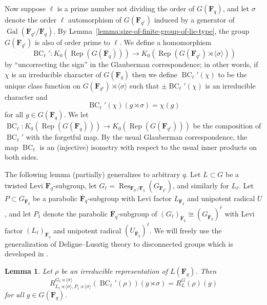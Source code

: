 \documentclass[11pt,reqno]{amsart}
\newtheorem{lemma}[theorem]{Lemma}
\theoremstyle{definition}
\newcommand{\F}{{\mathbf F}}
\DeclareMathOperator{\BC}{BC}
\DeclareMathOperator{\Gal}{Gal}
\DeclareMathOperator{\Rep}{Rep}
\DeclareMathOperator{\Res}{Res}
\newcommand{\ol}[1]{\overline{#1}}
\begin{document}
Now suppose $\ell$ is a prime number not dividing the order of $G(\F_q)$, and let $\sigma$ denote the order $\ell$ automorphism of $G(\F_{q^\ell})$ induced by a generator of $\Gal(\F_{q^\ell}/\F_q)$. By Lemma~\ref{lemma:size-of-finite-group-of-lie-type}, the group $G(\F_{q^\ell})$ is also of order prime to $\ell$. We define a homomorphism
\[
    \BC_\ell'\colon K_0(\Rep(G(\F_q))) \to K_0(\Rep(G(\F_{q^\ell})\rtimes\langle\sigma\rangle))
\]
by ``uncorrecting the sign'' in the Glauberman correspondence; in other words, if $\chi$ is an irreducible character of $G(\F_q)$ then we define $\BC_\ell'(\chi)$ to be the unique class function on $G(\F_{q^\ell}) \rtimes\langle\sigma\rangle$ such that $\pm\BC_\ell'(\chi)$ is an irreducible character and
\[
\BC_\ell'(\chi)(g\rtimes\sigma) = \chi(g)
\]
for all $g \in G(\F_q)$. We let $\BC_\ell\colon K_0(\Rep(G(\F_q))) \to K_0(\Rep(G(\F_{q^\ell})))$ be the composition of $\BC_\ell'$ with the forgetful map. By the usual Glauberman correspondence, the map $\BC_\ell$ is an (injective) isometry with respect to the usual inner products on both sides.

The following lemma (partially) generalizes \cite[Corollaire 3.5]{Dig99} to arbitrary $q$. Let $L \subset G$ be a twisted Levi $\F_q$-subgroup, let $G_\ell = \Res_{\F_{q^\ell}/\F_q}(G_{\F_{q^\ell}})$, and similarly for $L_\ell$. Let $P \subset G_{\ol\F_q}$ be a parabolic $\ol\F_q$-subgroup with Levi factor $L_{\ol\F_q}$ and unipotent radical $U$, and let $P_1$ denote the parabolic $\ol\F_q$-subgroup of $(G_\ell)_{\ol\F_q} \cong (G_{\ol\F_q})^\ell$ with Levi factor $(L_\ell)_{\ol\F_q}$ and unipotent radical $(U_{\ol\F_q})^\ell$. We will freely use the generalization of Deligne--Lusztig theory to disconnected groups which is developed in \cite{DM94}.

\begin{lemma}\label{lemma:dig99-3.5}
    Let $\rho$ be an irreducible representation of $L(\F_q)$. Then
    \[
    R_{L_\ell\rtimes\langle\sigma\rangle, P_1 \rtimes\langle\sigma\rangle}^{G_\ell\rtimes \langle\sigma\rangle}(\BC_\ell'(\rho))(g \rtimes \sigma) = R_L^G(\rho)(g)
    \]
    for all $g \in G(\F_q)$.
\end{lemma}
\end{document}
